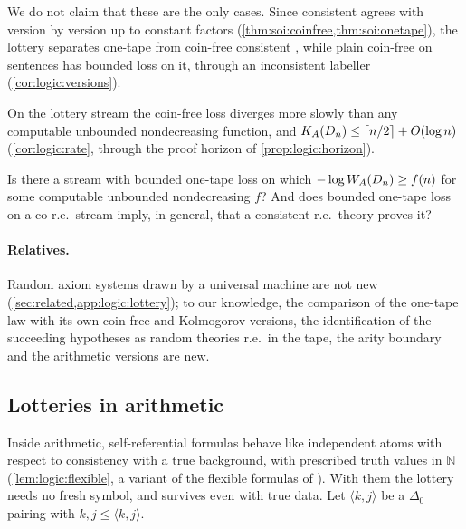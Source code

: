 We do not claim that these are the only cases. Since consistent \SOIabbr agrees with \SAIabbr version by version up to constant factors (\cref{thm:soi:coinfree,thm:soi:onetape}), the lottery separates one-tape from coin-free consistent \SOIabbr, while plain coin-free \SOIabbr on sentences has bounded loss on it, through an inconsistent labeller (\cref{cor:logic:versions}).

On the lottery stream the coin-free loss diverges more slowly than any computable unbounded nondecreasing function, and $K_{A}(D_n)\le\lceil n/2\rceil+O(\log n)$ (\cref{cor:logic:rate}, through the proof horizon of \cref{prop:logic:horizon}).

\begin{question}\label{q:logic:computablefast}
Is there a stream with bounded one-tape loss on which $-\log W_{A}(D_n)\ge f(n)$ for some computable unbounded nondecreasing $f$? And does bounded one-tape loss on a co-r.e.\ stream imply, in general, that a consistent r.e.\ theory proves it?
\end{question}

\paragraph{Relatives.} Random axiom systems drawn by a universal machine are not new (\cref{sec:related,app:logic:lottery}); to our knowledge, the comparison of the one-tape law with its own coin-free and Kolmogorov versions, the identification of the succeeding hypotheses as random theories r.e.\ in the tape, the arity boundary and the arithmetic versions are new.

\subsection{Lotteries in arithmetic}\label{sec:logic:arith}

Inside arithmetic, self-referential formulas behave like independent atoms with respect to consistency with a true background, with prescribed truth values in $\mathbb N$ (\cref{lem:logic:flexible}, a variant of the flexible formulas of \citealp{kripke1962flexible}). With them the lottery needs no fresh symbol, and survives even with true data. Let $\langle k,j\rangle$ be a $\Delta_0$ pairing with $k,j\le\langle k,j\rangle$.

